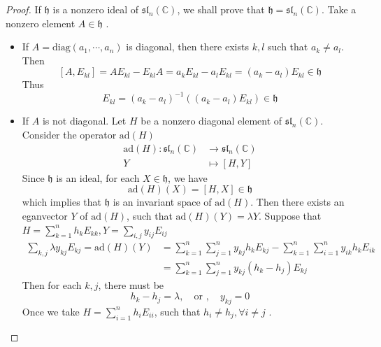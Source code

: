 \documentclass[../main.tex]{subfiles}
\begin{document}
\begin{proof}
    If \(  \mathfrak{h}  \) is a nonzero ideal of \(  \mathfrak{sl}_{n}\left( \mathbb{C}  \right)   \), we shall prove that \(  \mathfrak{h}= \mathfrak{sl}_{n}\left( \mathbb{C}  \right)   \). Take a nonzero element \(  A \in \mathfrak{h}  \)    . 
    \begin{itemize}
        \item If \(  A =\mathrm{diag}\left( a_1,\cdots ,a_{n} \right)   \) is diagonal,   then there exists \(  k,l  \) such that \(a_{k}\neq a_{l} \). Then \[
        \left[ A,E_{kl} \right]= AE_{kl}-E_{kl}A=  a_{k} E_{kl}-a_{l}E_{kl}= \left( a_{k}-a_{l} \right)E_{kl} \in \mathfrak{h}
        \]  Thus \[
        E_{kl}= \left( a_{k}-a_{l} \right)^{-1} \left( \left( a_{k}-a_{l} \right)E_{kl}  \right)\in \mathfrak{h}  
        \]
        \item If \(  A  \) is not diagonal. Let \(  H  \) be a nonzero diagonal element of \(  \mathfrak{sl}_{n}\left( \mathbb{C}  \right)   \).  Consider the operator \(  \mathrm{ad}\left( H \right)   \) \[
        \begin{aligned}
        \mathrm{ad}\left( H \right): \mathfrak{sl}_{n}\left( \mathbb{C}  \right)&\to \mathfrak{sl}_{n}\left( \mathbb{C}  \right)\\ 
         Y &\mapsto \left[ H,Y \right]     
        \end{aligned}
        \] Since \(  \mathfrak{h}  \) is an ideal, for each \(  X \in \mathfrak{h}  \), we have \[
        \mathrm{ad}\left( H \right)\left( X \right)= \left[ H,X \right]\in \mathfrak{h}   
        \]which implies that \(  \mathfrak{h}  \) is an invariant space of \(  \mathrm{ad}\left( H \right)   \). Then there exists an eganvector \(  Y  \) of \(  \mathrm{ad}\left( H \right)   \), such that \(  \mathrm{ad}\left( H \right)\left( Y \right)=  \lambda Y    \).  
 Suppose that \(  H= \sum _{k= 1}^{n}h_{k}E_{kk}, Y= \sum _{i,j}y_{ij}E_{ij}  \)  \[
           \begin{aligned}
          \sum _{k,j} \lambda y_{kj}E_{kj}=    \mathrm{ad}\left( H \right)\left( Y \right)&= \sum _{k= 1}^{n}  \sum _{j= 1}^{n}y_{kj}h_{k}E_{kj}-\sum _{k= 1}^{n}\sum _{i= 1}^{n}y_{ik}h_{k}E_{ik} \\ 
             &= \sum _{k = 1}^{n}\sum _{j= 1}^{n}y_{kj}\left( h_{k}-h_{j} \right)E_{kj} 
           \end{aligned}
            \]  Then for each \(  k,j  \), there must be \[
            h_{k}-h_{j}=  \lambda ,\quad \text{or },\quad y_{kj}= 0
            \] Once we take \(  H= \sum _{i = 1}^{n}h_{i}E_{ii}  \), such that \(  h_{i}\neq h_{j},\forall i\neq j  \)   . 

\end{itemize}
\end{proof}
\end{document}
